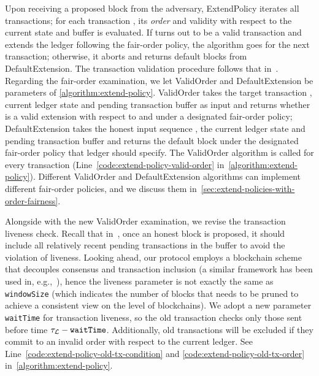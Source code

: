 Upon receiving a proposed block from the adversary, \textsf{ExtendPolicy} iterates all transactions; for each transaction \tx, its \emph{order} and validity with respect to the current state and buffer is evaluated.
%
If \tx turns out to be a valid transaction and extends the ledger following the fair-order policy, the algorithm goes for the next transaction; otherwise, it aborts and returns default blocks from \textsf{DefaultExtension}.
%
The transaction validation procedure follows that in~\cite{C:BMTZ17}.
%
Regarding the fair-order examination, we let \textsf{ValidOrder} and \textsf{DefaultExtension} be parameters of \cref{algorithm:extend-policy}.
%
\textsf{ValidOrder} takes the target transaction \tx, current ledger state \state and pending transaction buffer \buffer as input and returns whether \tx is a valid extension with respect to \state and \buffer under a designated fair-order policy; \textsf{DefaultExtension} takes the honest input sequence \honestInputSeq, the current ledger state \state and pending transaction buffer \buffer and returns the default block under the designated fair-order policy that ledger \funcFairLedger should specify.
%
The \textsf{ValidOrder} algorithm is called for every transaction (Line~\ref*{code:extend-policy-valid-order} in~\cref{algorithm:extend-policy}).
%
Different \textsf{ValidOrder} and \textsf{DefaultExtension} algorithms can implement different fair-order policies, and we discuss them in~\cref{sec:extend-policies-with-order-fairness}.

Alongside with the new \textsf{ValidOrder} examination, we revise the transaction liveness check.
%
Recall that in~\cite{C:BMTZ17}, once an honest block is proposed, it should include all relatively recent pending transactions in the buffer to avoid the violation of liveness.
%
Looking ahead, our protocol employs a blockchain scheme that decouples consensus and transaction inclusion (a similar framework has been used in, e.g.,~\cite{PODC:PasShi17,TCC:FGKR20}), hence the liveness parameter is not exactly the same as \texttt{windowSize} (which indicates the number of blocks that needs to be pruned to achieve a consistent view on the level of blockchains).
%
We adopt a new parameter \texttt{waitTime} for transaction liveness, so the old transaction checks only those sent before time $\tau_\mathcal{L} - \mathtt{waitTime}$.
%
Additionally, old transactions will be excluded if they commit to an invalid order with respect to the current ledger.
%
See Line~\ref*{code:extend-policy-old-tx-condition} and \ref*{code:extend-policy-old-tx-order} in~\cref{algorithm:extend-policy}.

